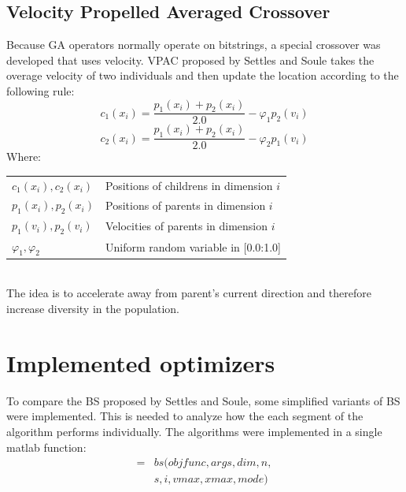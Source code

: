 \documentclass{acm_proc_article-sp}
\begin{document}
\subsection{Velocity Propelled Averaged Crossover}\label{ssec:vpac}
Because GA operators normally operate on bitstrings, a special crossover was developed that uses velocity. VPAC proposed by Settles and Soule takes the overage velocity of two individuals and then update the location according to the following rule:
  \begin{equation}
   c_1(x_i) = \frac{p_1(x_i) + p_2(x_i)}{2.0} - \varphi_1 p_2(v_i)
  \end{equation}
  \begin{equation}
   c_2(x_i) = \frac{p_1(x_i) + p_2(x_i)}{2.0} - \varphi_2 p_1(v_i)
  \end{equation}
  \bigskip
  Where:\\
  \bigskip
  \begin{tabular}{ll}
  $c_1(x_i), c_2(x_i) $ & Positions of childrens in dimension $i$\\
  $p_1(x_i), p_2(x_i) $ & Positions of parents in dimension $i$\\
  $p_1(v_i), p_2(v_i) $ & Velocities of parents in dimension $i$\\
  $\varphi_1, \varphi_2 $ & Uniform random variable in [0.0:1.0]\\
  \end{tabular}\\
The idea is to accelerate away from parent's current direction and therefore increase diversity in the population.

\section{Implemented optimizers}\label{sec:optimizers}
To compare the BS proposed by Settles and Soule, some simplified variants of BS were implemented. This is needed to analyze how the each segment of the algorithm performs individually. The algorithms were implemented in a single matlab function:
\begin{eqnarray*}
 [fxmin, xmin, history] = & bs(objfunc, args, dim, n, \\
    & s, i, vmax, xmax, mode)
\end{eqnarray*}
\end{document}
